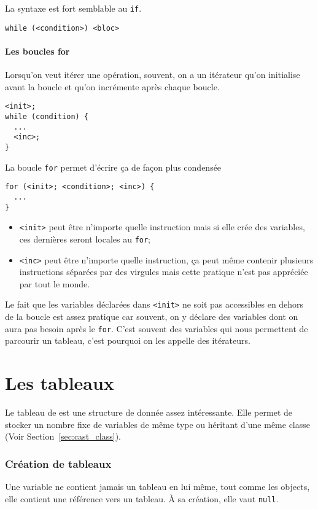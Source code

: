 La syntaxe est fort semblable au \lstinline|if|.
\begin{lstlisting}
while (<condition>) <bloc>
\end{lstlisting}

\subsection{Les boucles for}
Lorsqu'on veut itérer une opération, souvent, on a un itérateur qu'on
initialise avant la boucle et qu'on incrémente après chaque boucle.
\begin{lstlisting}
<init>;
while (condition) {
  ...
  <inc>;
}
\end{lstlisting}

La boucle \lstinline|for| permet d'écrire ça de façon plus condensée
\begin{lstlisting}
for (<init>; <condition>; <inc>) {
  ...
}
\end{lstlisting}

\begin{itemize}
  \item \lstinline|<init>| peut être n'importe quelle
    instruction mais si elle crée
    des variables, ces dernières seront locales au \lstinline|for|;
  \item \lstinline|<inc>| peut être n'importe quelle instruction, ça peut même
    contenir plusieurs instructions séparées par des virgules mais cette
    pratique n'est pas appréciée par tout le monde.
\end{itemize}
Le fait que les variables déclarées dans \lstinline|<init>| ne soit pas accessibles en dehors de la boucle
est assez pratique car souvent,
on y déclare des variables dont on aura pas besoin après le \lstinline|for|.
C'est souvent des variables qui nous permettent de parcourir un tableau,
c'est pourquoi on les appelle des itérateurs.

\part{Les tableaux}
Le tableau de \java{} est une structure de donnée assez intéressante.
Elle permet de stocker un nombre fixe de variables de même type
ou héritant d'une même classe (Voir Section~\ref{sec:cast_class}).

\section{Création de tableaux}
Une variable ne contient jamais un tableau en lui même,
tout comme les objects, elle contient une référence vers un tableau.
À sa création, elle vaut \lstinline|null|.

